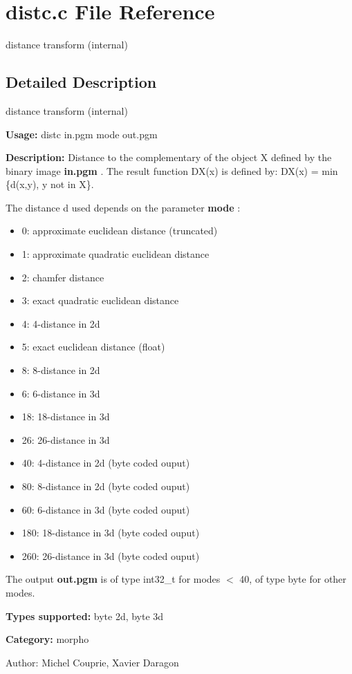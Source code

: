 \section{distc.c File Reference}
\label{distc_8c}
distance transform (internal)  




\label{_details}
\subsection{Detailed Description}
distance transform (internal) 

{\bf Usage:} distc in.pgm mode out.pgm

{\bf Description:} Distance to the complementary of the object X defined by the binary image {\bf in.pgm} . The result function DX(x) is defined by: DX(x) = min \{d(x,y), y not in X\}.

The distance d used depends on the parameter {\bf mode} : \begin{itemize}
\item 0: approximate euclidean distance (truncated) \item 1: approximate quadratic euclidean distance \item 2: chamfer distance \item 3: exact quadratic euclidean distance \item 4: 4-distance in 2d \item 5: exact euclidean distance (float) \item 8: 8-distance in 2d \item 6: 6-distance in 3d \item 18: 18-distance in 3d \item 26: 26-distance in 3d \item 40: 4-distance in 2d (byte coded ouput) \item 80: 8-distance in 2d (byte coded ouput) \item 60: 6-distance in 3d (byte coded ouput) \item 180: 18-distance in 3d (byte coded ouput) \item 260: 26-distance in 3d (byte coded ouput)\end{itemize}
The output {\bf out.pgm} is of type int32\_\-t for modes $<$ 40, of type byte for other modes.

{\bf Types supported:} byte 2d, byte 3d

{\bf Category:} morpho

\begin{Desc}
\item[Author:]Michel Couprie, Xavier Daragon \end{Desc}
